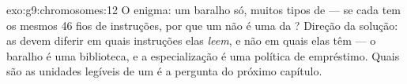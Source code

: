 \begin{solution}{exo:g9:chromosomes:12}
O enigma: um baralho só, muitos tipos de  --- se cada
 tem os mesmos 46 fios de instruções, por que um
 não é uma  da ? Direção da solução: as
 devem diferir em quais instruções elas \emph{leem},
e não em quais elas têm --- o baralho é uma biblioteca, e a
especialização é uma política de empréstimo. Quais são as
unidades legíveis de um  é a pergunta do próximo
capítulo.
\end{solution}

